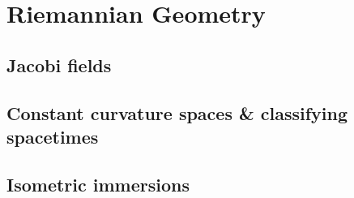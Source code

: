 \documentclass[../geometry_main.tex]{subfiles}
\begin{document}
\chapter{Riemannian Geometry}



\section{Jacobi fields} 


\section{Constant curvature spaces \& classifying spacetimes} 




\section{Isometric immersions} 
\end{document}
